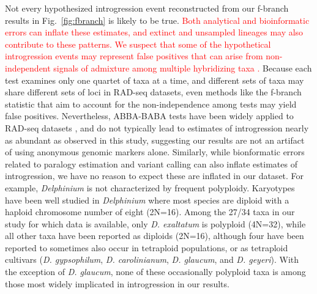 \documentclass[11pt]{article}
\begin{document}
Not every hypothesized introgression event reconstructed from our f-branch results 
in Fig.~\ref{fig:fbranch} is likely to be true. \textcolor{red}{Both analytical and bioinformatic
errors can inflate these estimates, and extinct and unsampled lineages may also contribute to these patterns. We suspect that some of the hypothetical introgression events may
represent false positives that can arise from non-independent signals of
admixture among multiple hybridizing taxa \citep{eaton_historical_2015, malinsky_dsuite_2021}.} Because each test examines only one quartet of taxa at a time, and different sets of taxa may share different sets of loci in RAD-seq datasets, even methods like the f-branch statistic that aim to account for the non-independence among tests may yield false positives. Nevertheless, ABBA-BABA tests have been widely applied to RAD-seq datasets \citep{heliconius_genome_consortium_butterfly_2012, eaton_inferring_2013, eaton_historical_2015, mccluskey_phylogeny_2015, vargas_conflicting_2017},
and do not typically lead to estimates of introgression nearly as abundant as observed in this study, suggesting our results are not an artifact of using anonymous genomic markers alone.
% 
Similarly, while bionformatic errors related to paralogy estimation and variant calling
can also inflate estimates of introgression, we have no reason to expect these
are inflated in our dataset. 
For example, \emph{Delphinium} is not characterized by frequent polyploidy.
% 
Karyotypes have been well studied in \emph{Delphinium} \citep{turner_cytogenetics_1992, legro_species_1961, lewis-chromosome}
where most species are diploid with a haploid chromosome number of eight (2N=16).
Among the 27/34 taxa in our study for which data is available, only \emph{D. exaltatum} is polyploid (4N=32), while all other taxa have been reported as diploids (2N=16), although four have been reported to sometimes also occur in tetraploid populations, or as tetraploid cultivars (\emph{D. gypsophilum}, \emph{D. carolinianum}, \emph{D. glaucum}, and \emph{D. geyeri}). With the exception of \emph{D. glaucum}, none of these occasionally polyploid taxa is among those most widely implicated in introgression in our results.
\end{document}
